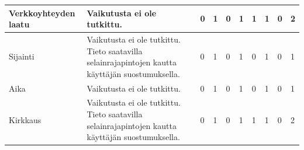 \documentclass[finnish, 12pt, a4paper, elec, utf8, a-1b]{aaltothesis}
\begin{document}
{\begin{longtable}{p{2.5cm}|p{6cm}|p{0.5cm}p{0.5cm}p{0.5cm}|p{0.5cm}|p{0.5cm}p{0.5cm}p{0.5cm}|p{0.5cm}|}
    \midrule
    Verkkoyhteyden laatu                    & Vaikutusta ei ole tutkittu.                                                                                                                                                                                                                                                                                                                                             & 0                                          & 1                                   & 0                                      & 1                            & 1                                               & 1                                         & 0                                         & 2                            \\
    \midrule
    Sijainti                                & Vaikutusta ei ole tutkittu. Tieto saatavilla selainrajapintojen kautta käyttäjän suostumuksella.                                                                                                                                                                                                                                                                        & 0                                          & 1                                   & 0                                      & 1                            & 0                                               & 1                                         & 0                                         & 1                            \\
    \midrule
    Aika                                    & Vaikutusta ei ole tutkittu.                                                                                                                                                                                                                                                                                                                                             & 0                                          & 1                                   & 0                                      & 1                            & 0                                               & 1                                         & 0                                         & 1                            \\
    \midrule
    Kirkkaus                                & Vaikutusta ei ole tutkittu. Tieto saatavilla selainrajapintojen kautta käyttäjän suostumuksella.                                                                                                                                                                                                                                                                        & 0                                          & 1                                   & 0                                      & 1                            & 1                                               & 1                                         & 0                                         & 2                            \\

\end{longtable}}
\end{document}
